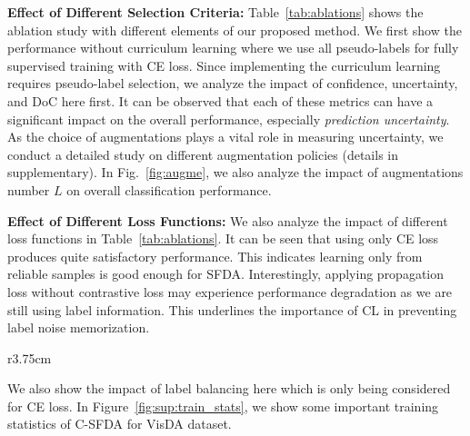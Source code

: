 \documentclass[10pt,twocolumn,letterpaper]{article}
\begin{document}
\vspace{0.6mm}
\noindent \textbf{Effect of Different Selection Criteria:}
Table~\ref{tab:ablations} shows the ablation study with different elements of our proposed method. We first show the performance without curriculum learning where we use all pseudo-labels for fully supervised training with CE loss. Since implementing the curriculum learning requires pseudo-label selection, we analyze the impact of confidence, uncertainty, and DoC here first. It can be observed that each of these metrics can have a significant impact on the overall performance, especially \emph{prediction uncertainty}. As the choice of augmentations plays a vital role in measuring uncertainty, we conduct a detailed study on different augmentation policies (details in supplementary). In Fig.~\ref{fig:augme}, we also analyze the impact of augmentations number $L$ on overall classification performance.  

\vspace{0.6mm}
\noindent \textbf{Effect of Different Loss Functions:}
We also analyze the impact of different loss functions in Table~\ref{tab:ablations}. It can be seen that using only CE loss produces quite satisfactory performance. This indicates learning only from reliable samples is good enough for SFDA. Interestingly, applying propagation loss without contrastive loss may experience performance degradation as we are still using label information. 
This underlines the importance of CL in preventing label noise memorization. 
\begin{wraptable}{r}{3.75cm}
        \centering
        \vspace{-2.5mm}
        \caption{\textbf{\footnotesize Effect of Curriculum}}
        \vspace{-2.5mm}
        \vspace{-2.5mm}
        \label{tab:currculum}
\end{wraptable}
We also show the impact of label balancing here which is only being considered for CE loss. In Figure~\ref{fig:sup:train_stats}, we show some important training statistics of C-SFDA for VisDA dataset. 
\end{document}
